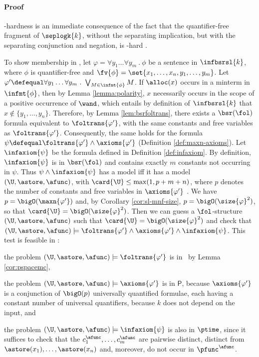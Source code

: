 \paragraph{Proof}
  \pspace-hardness is an immediate consequence of the fact that the
  quan\-ti\-fier-free fragment of $\seplogk{k}$, without the
  separating implication, but with the separating conjunction and
  negation, is \pspace-hard \cite[Proposition
    5]{CalcagnoYangOHearn01}.

  To show membership in \pspace, let $\varphi = \forall y_1 \ldots
  \forall y_m ~.~ \phi$ be a sentence in $\infbsrsl{k}$, where $\phi$
  is quantifier-free and $\fv{\phi} =
  \set{x_1,\ldots,x_n,y_1,\ldots,y_m}$. Let $\varphi' \defequal
  \forall y_1 \ldots \forall y_m ~.~ \bigvee_{M \in \infmt{\phi}}
  M$. If $\alloc(x)$ occurs in a minterm in $\infmt{\phi}$, then by
  Lemma \ref{lemma:polarity}, $x$ necessarily occurs in the scope of a
  positive occurrence of $\wand$, which entails by definition of
  $\infbsrsl{k}$ that $x \not \in \{ y_1,\dots,y_n\}$.  Therefore, by
  Lemma \ref{lem:bsrfoltrans}, there exists a $\bsr(\fol)$ formula
  equivalent to $\foltrans{\varphi'}$, with the same constants and
  free variables as $\foltrans{\varphi'}$. Consequently, the same
  holds for the formula $\psi \defequal \foltrans{\varphi'} \wedge
  \axioms{\varphi'}$ (Definition \ref{def:maxn-axioms}). Let
  $\infaxiom{\psi}$ be the formula defined in Definition
  \ref{def:infaxiom}.  By definition, $\infaxiom{\psi}$ is in
  $\bsr(\fol)$ and contains exactly $m$ constants not occurring in
  $\psi$. Thus $\psi \wedge \infaxiom{\psi}$ has a model iff it has a
  model $(\U,\astore,\afunc)$, with $\card{\U} \leq \max(1,p+m+n)$,
  where $p$ denotes the number of constants and free variables in
  $\axioms{\varphi'}$ \cite[Proposition
    6.2.17]{BorgerGradelGurevich97}. We have $p =
  \bigO(\maxn{\varphi'})$ and, by Corollary \ref{cor:sl-mnf-size},
  $p=\bigO(\size{\varphi}^2)$, so that $\card{\U} =
  \bigO(\size{\varphi}^2)$. Then we can guess a $\fol$-structure
  $(\U,\astore,\afunc)$ such that $\card{\U} =
  \bigO(\size{\varphi}^2)$ and check that $(\U,\astore,\afunc) \models
  \foltrans{\varphi'} \wedge \axioms{\varphi'} \wedge
  \infaxiom{\psi}$. This test is feasible
  in \pspace:\begin{compactitem}
    \item the problem $(\U,\astore,\afunc) \models
      \foltrans{\varphi'}$ is in \pspace\ by Lemma \ref{cor:pspacemc},
  \item the problem $(\U,\astore,\afunc) \models \axioms{\varphi'}$ is
    in $\mathsf{P}$, because $\axioms{\varphi'}$ is a conjunction of
    $\bigO(p)$ universally quantified formulae, each having a constant
    number of universal quantifiers, because $k$ does not depend on
    the input, and
  \item the problem $(\U,\astore,\afunc) \models \infaxiom{\psi}$ is
    also in $\ptime$, since it suffices to check that the
    $c_1^\afunc,\dots,c_m^\afunc$ are pairwise distinct, distinct from
    $\astore(x_1),\dots,\astore(x_n)$ and, moreover, do not occur in
    $\pfunc^\afunc$.
    \end{compactitem}

